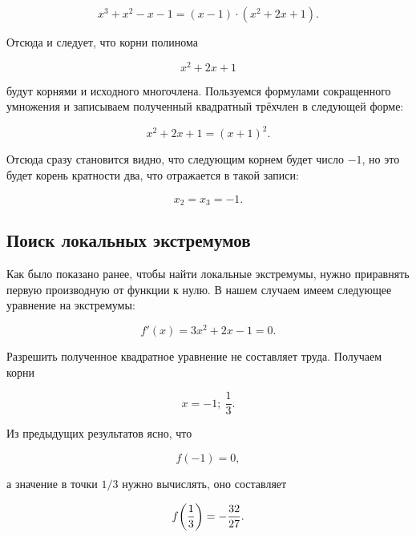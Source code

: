 \documentclass[12pt]{article}
\begin{document}
\begin{equation}
	x^3+x^2-x-1 = (x-1)\cdot(x^2+2x+1).
\end{equation}

Отсюда и следует, что корни полинома

\begin{equation}
	x^2 + 2x +1
\end{equation}

будут корнями и исходного многочлена. Пользуемся формулами сокращенного умножения и записываем полученный квадратный трёхчлен в следующей форме:

\begin{equation}
	x^2 + 2x +1 = (x+1)^2.
\end{equation}

Отсюда сразу становится видно, что следующим корнем будет число $-1$, но это будет корень кратности два, что отражается в такой записи:

\begin{equation}
	x_2 = x_3 = -1.
\end{equation}

\subsection{Поиск локальных экстремумов} %
Как было показано ранее, чтобы найти локальные экстремумы, нужно приравнять первую производную от функции к нулю. В нашем случаем имеем следующее уравнение на экстремумы:

\begin{equation}
	f'(x) = 3x^2 +2x - 1 = 0.
\end{equation}

Разрешить полученное квадратное уравнение не составляет труда. Получаем корни 

\begin{equation}
	x = -1;\ \dfrac{1}{3}. 
\end{equation}

Из предыдущих результатов ясно, что 

\begin{equation}
	f(-1) = 0,
\end{equation}

а значение в точки $1/3$ нужно вычислять, оно составляет

\begin{equation}
	f\qty(\dfrac{1}{3}) = -\dfrac{32}{27}.
\end{equation}
\end{document}
